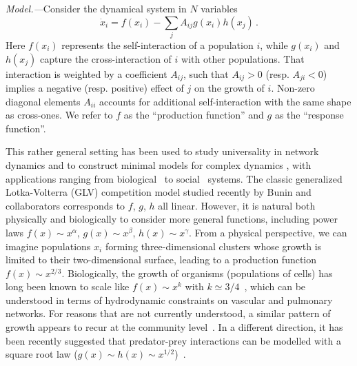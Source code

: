 \emph{Model.---}Consider the dynamical system in $N$ variables
\begin{equation}\label{dynamics}
    \dot{x}_i = f(x_i) - \sum_{j}A_{ij}g(x_i)h(x_j) \, .
\end{equation}
Here $f(x_i)$ represents the self-interaction of a population $i$, while $g(x_i)$ and $h(x_j)$ capture the cross-interaction of $i$ with other populations. That interaction is weighted by a coefficient $A_{ij}$, such that $A_{ij} > 0$ (resp.
$A_{ji} < 0$) implies a negative (resp.
positive) effect of $j$ on the growth of $i$. Non-zero diagonal elements $A_{ii}$ accounts for additional self-interaction with the same shape as cross-ones. 
We refer to $f$ as the ``production function'' and $g$ as the ``response function''.

This rather general setting has been used to study universality in network dynamics \cite{Barzel2013} and to construct minimal models for complex dynamics \cite{Barzel2015}, with applications ranging from biological~\cite{Alon2006,Karlebach2008} 
to social~\cite{Pastor-Satorras2001,Hufnagel2004,Dodds2005} systems.
The classic generalized Lotka-Volterra (GLV) competition model studied recently by Bunin and collaborators \cite{bunin2017ecological, biroli2018marginally} corresponds to $f$, $g$, $h$ all linear. 
However, it is natural both physically and biologically to consider more general functions, including power laws $f(x)\sim x^\alpha$, $g(x)\sim x^\beta$, $h(x) \sim x^\gamma$.
From a physical perspective, we can imagine populations $x_i$ forming three-dimensional clusters whose growth is limited to their two-dimensional surface, leading to a production function $f(x) \sim x^{2/3}$.
Biologically, the growth of organisms (populations of cells) has long been known to scale like $f(x) \sim x^k$ with $k\simeq 3/4$~\cite{Brown2004}, which can be understood in terms of hydrodynamic constraints on vascular and pulmonary networks.
For reasons that are not currently understood, a similar pattern of growth appears to recur at the community level~\cite{Hatton2015,Hatton2023}.
In a different direction, it has been recently suggested that predator-prey interactions can be modelled with a square root law ($g(x) \sim h(x) \sim x^{1/2}$)~\cite{Barbier2021,Mazzarisi2023}.